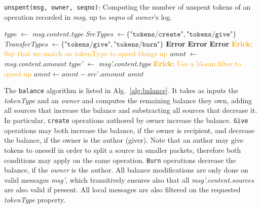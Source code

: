 \documentclass[sigplan,screen,10pt]{acmart}
\newcommand\el[1]{\textcolor{orange}{{\bf Erick: }#1}}
\begin{document}
\begin{algorithm}
\caption{\texttt{unspent(msg, owner, seqno)}: Computing the number of unspent tokens of an operation recorded in \textit{msg}, up to \textit{seqno} of \textit{owner}'s log.}
\label{alg:unspent}
\begin{algorithmic}[1]
  \State \textit{type} $\leftarrow$ \textit{msg.content.type}
  \State \textit{SrcTypes} $\leftarrow \{ \texttt{"tokens/create"}, \texttt{"tokens/give"} \}$
  \State \textit{TransferTypes} $\leftarrow \{ \texttt{"tokens/give"}, \texttt{"tokens/burn"} \}$
   \textbf{Error}
  \EndIf
       \textbf{Error}
      \EndIf
       \textbf{Error}
      \EndIf
  \EndIf
  \State \el{Say that we match on tokenType to speed things up}
    \State \textit{amnt} $\leftarrow$ \textit{msg.content.amount}
     \label{alg:unspent:valid2}
             \State \textit{type'} $\leftarrow$ \textit{msg'.content.type}
                    \State \el{Use a bloom filter to speed up}
            	     \label{alg:unspent:valid3}
                             \State  $\textit{amnt} \leftarrow \textit{amnt} - \textit{src'.amount}$
                         \EndIf
	             \EndIf
                \EndFor
            \EndIf 
        \EndIf
    \EndFor
  \State \Return \textit{amnt}
\end{algorithmic}
\label{alg:unspent}
\end{algorithm}

The \texttt{balance} algorithm is listed in Alg.~\ref{alg:balance}. It takes as inputs the \textit{tokenType} and an \textit{owner} and computes the remaining balance they own, adding all sources that increase the balance and substracting all sources that decrease it. In particular, \texttt{create} operations authored by owner increase the balance. \texttt{Give} operations may both increase the balance, if the owner is recipient, and decrease the balance, if the owner is the author (giver). Note that an author may give tokens to oneself in order to split a source in smaller packets, therefore both conditions may apply on the same operation. \texttt{Burn} operations decrease the balance, if the \textit{owner} is the author. All balance modifications are only done on valid messages \textit{msg'}, which transitively ensures also that all \textit{msg'.content.sources} are also valid if present. All local messages are also filtered on the requested \textit{tokenType} property.
\end{document}
